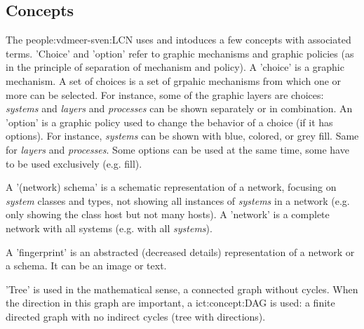 \subsection{Concepts}
    The \ac{people:vdmeer-sven:LCN} uses and intoduces a few concepts with associated terms.
    'Choice' and 'option' refer to graphic mechanisms and graphic policies (as in the principle of separation of mechanism and policy).
    A 'choice' is a graphic mechanism. A set of choices is a set of grpahic mechanisms from which one or more can be selected.
    For instance, some of the graphic layers are choices: \textit{systems} and \textit{layers} and \textit{processes} can be shown separately or in combination.
    An 'option' is a graphic policy used to change the behavior of a choice (if it has options).
    For instance, \textit{systems} can be shown with blue, colored, or grey fill. Same for \textit{layers} and \textit{processes}.
    Some options can be used at the same time, some have to be used exclusively (e.g. fill).

    A '(network) schema' is a schematic representation of a network, focusing on \textit{system} classes and types,
    not showing all instances of \textit{systems} in a network (e.g. only showing the class host but not many hosts).
    A 'network' is a complete network with all systems (e.g. with all \textit{systems}).

    A 'fingerprint' is an abstracted (decreased details) representation of a network or a schema.
    It can be an image or text.

    'Tree' is used in the mathematical sense, a connected graph without cycles.
    When the direction in this graph are important, a \ac{ict:concept:DAG} is used: a finite directed graph with no indirect cycles (tree with directions).


